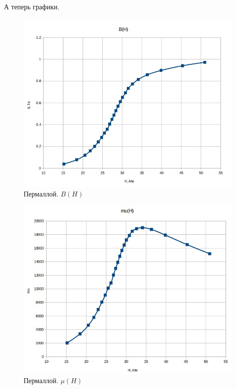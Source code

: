 \documentclass[a4paper,12pt]{article} %
\begin{document}
\newpage
А теперь графики.
\begin{figure}[h!]
	\centering
	\includegraphics[scale=0.45]{Pictures/ПЕРМАЛЛОЙ_B(H).jpg}
	\caption{Пермаллой. $B(H)$}
\end{figure}

\begin{figure}[h!]
	\centering
	\includegraphics[scale=0.47]{Pictures/ПЕРМАЛЛОЙ_mu(H).jpg}
	\caption{Пермаллой. $\mu (H)$}
\end{figure}
\end{document}
